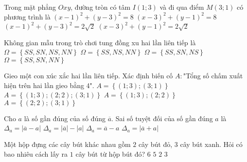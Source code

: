 \begin{ex}%
Trong mặt phẳng $Oxy$, đường tròn có tâm $I(1;3)$ và đi qua điểm $M(3;1)$ có phương trình là
\choice
{\True $(x-1)^2+(y-3)^2=8$}
{$(x-3)^2+(y-1)^2=8$}
{$(x-1)^2+(y-3)^2=2\sqrt{2}$}
{$(x-3)^2+(y-1)^2=2\sqrt{2}$}
\end{ex}

\begin{ex}%
Không gian mẫu trong trò chơi tung đồng xu hai lần liên tiếp là
\choice
{\True $\Omega=\left\{SS,SN,NS,NN\right\}$}
{$\Omega=\left\{SS,NS,NN\right\}$}
{$\Omega=\left\{SS,SN,NS\right\}$}
{$\Omega=\left\{SS,SN,NN\right\}$}
\end{ex}

\begin{ex}%
Gieo một con xúc xắc hai lần liên tiếp. Xác định biến cố $A\colon$"Tổng số chấm xuất hiện trên hai lần gieo bằng 4".
\choice
{$A=\left\{(1;3); (3;1)\right\}$}
{\True $A=\left\{(1;3); (2;2); (3;1)\right\}$}
{$A=\left\{(1;3); (2;2)\right\}$}
{$A=\left\{(2;2); (3;1)\right\}$}
\end{ex}

\begin{ex}%
Cho $a$ là số gần đúng của số đúng $\overline{a}$. Sai số tuyệt đối của số gần đúng $a$ là
\choice
{\True $\Delta_a=\left|\overline{a}-a\right|$}
{$\Delta_a=\left|\overline{a}\right|-\left| a\right|$}
{$\Delta_a=\overline{a}-a$}
{$\Delta_a=\left|\overline{a}+a\right|$}
\end{ex}

\begin{ex}%
Một hộp đựng các cây bút khác nhau gồm $2$ cây bút đỏ, $3$ cây bút xanh. Hỏi có bao nhiêu cách lấy ra $1$ cây bút từ hộp bút đó?
\choice
{$6$}
{\True $5$}
{$2$}
{$3$}
\end{ex}

